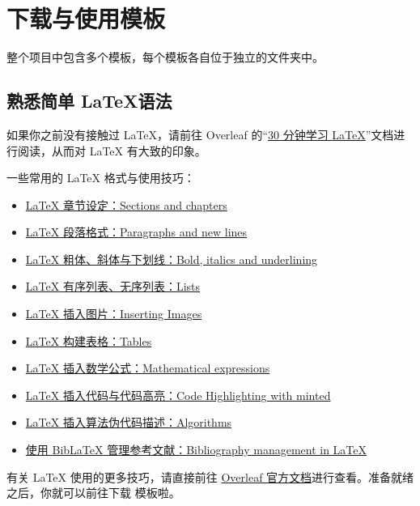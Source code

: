 \section{下载与使用模板} \label{sec:downloading-templates}
{\BIThesis} 整个项目中包含多个模板，每个模板各自位于独立的文件夹中。

\subsection{熟悉简单 \LaTeX 语法} \label{subsec:latex-grammar}
如果你之前没有接触过 {\LaTeX}，请前往 Overleaf 的“\href{https://www.overleaf.com/learn/latex/Learn_LaTeX_in_30_minutes}{30 分钟学习 {\LaTeX}}”文档进行阅读，从而对 {\LaTeX} 有大致的印象。

一些常用的 {\LaTeX} 格式与使用技巧：

\begin{itemize}
  \item \href{https://www.overleaf.com/learn/latex/Sections_and_chapters}{{\LaTeX} 章节设定：Sections and chapters}
  \item \href{https://www.overleaf.com/learn/latex/Paragraphs_and_new_lines}{{\LaTeX} 段落格式：Paragraphs and new lines}
  \item \href{https://www.overleaf.com/learn/latex/Bold,_italics_and_underlining}{{\LaTeX} 粗体、斜体与下划线：Bold, italics and underlining}
  \item \href{https://www.overleaf.com/learn/latex/Lists}{{\LaTeX} 有序列表、无序列表：Lists}
  \item \href{https://www.overleaf.com/learn/latex/Inserting_Images}{{\LaTeX} 插入图片：Inserting Images}
  \item \href{https://www.overleaf.com/learn/latex/Tables}{{\LaTeX} 构建表格：Tables}
  \item \href{https://www.overleaf.com/learn/latex/Mathematical_expressions}{{\LaTeX} 插入数学公式：Mathematical expressions}
  \item \href{https://www.overleaf.com/learn/latex/Code_Highlighting_with_minted}{{\LaTeX} 插入代码与代码高亮：Code Highlighting with minted}
  \item \href{https://www.overleaf.com/learn/latex/algorithms}{{\LaTeX} 插入算法伪代码描述：Algorithms}
  \item \href{https://www.overleaf.com/learn/latex/Bibliography_management_in_LaTeX}{使用 {Bib\LaTeX} 管理参考文献：Bibliography management in LaTeX}
\end{itemize}

有关 {\LaTeX} 使用的更多技巧，请直接前往 \href{https://www.overleaf.com/learn/latex/Main_Page}{Overleaf 官方文档}进行查看。准备就绪之后，你就可以前往下载 {\BIThesis} 模板啦。

